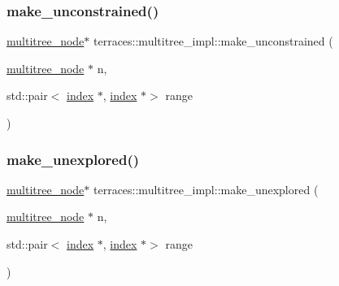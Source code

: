 \mbox{\label{namespaceterraces_1_1multitree__impl_a442f7413aee6e1e97a2c7dfeb1a9c059}} 
\subsubsection{\texorpdfstring{make\+\_\+unconstrained()}{make\_unconstrained()}}
{\footnotesize\ttfamily \hyperlink{structterraces_1_1multitree__node}{multitree\+\_\+node}$\ast$ terraces\+::multitree\+\_\+impl\+::make\+\_\+unconstrained (\begin{DoxyParamCaption}\item[{\hyperlink{structterraces_1_1multitree__node}{multitree\+\_\+node} $\ast$}]{n,  }\item[{std\+::pair$<$ \hyperlink{namespaceterraces_adbc33ccb543d1634e96d0eb02e472c77}{index} $\ast$, \hyperlink{namespaceterraces_adbc33ccb543d1634e96d0eb02e472c77}{index} $\ast$$>$}]{range }\end{DoxyParamCaption})\hspace{0.3cm}{\ttfamily [inline]}}

\mbox{\label{namespaceterraces_1_1multitree__impl_a97aee75a65e49257b8b21eba0dc090a2}} 
\subsubsection{\texorpdfstring{make\+\_\+unexplored()}{make\_unexplored()}}
{\footnotesize\ttfamily \hyperlink{structterraces_1_1multitree__node}{multitree\+\_\+node}$\ast$ terraces\+::multitree\+\_\+impl\+::make\+\_\+unexplored (\begin{DoxyParamCaption}\item[{\hyperlink{structterraces_1_1multitree__node}{multitree\+\_\+node} $\ast$}]{n,  }\item[{std\+::pair$<$ \hyperlink{namespaceterraces_adbc33ccb543d1634e96d0eb02e472c77}{index} $\ast$, \hyperlink{namespaceterraces_adbc33ccb543d1634e96d0eb02e472c77}{index} $\ast$$>$}]{range }\end{DoxyParamCaption})\hspace{0.3cm}{\ttfamily [inline]}}

